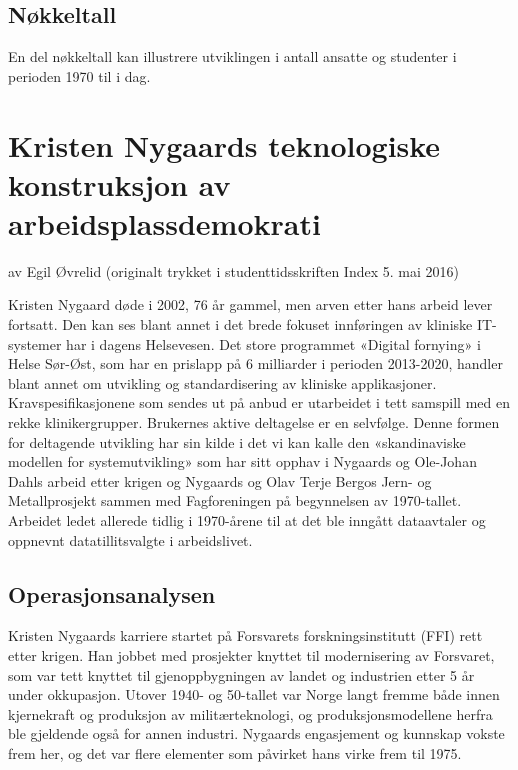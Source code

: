 \documentclass[../main.tex]{subfiles}
\begin{document}
\subsection{Nøkkeltall}
En del nøkkeltall kan illustrere utviklingen i antall ansatte og studenter i perioden 1970 til i dag.


\section{Kristen Nygaards teknologiske konstruksjon av arbeidsplassdemokrati}

av Egil Øvrelid
(originalt trykket i studenttidsskriften Index 5. mai 2016)

Kristen Nygaard døde i 2002, 76 år gammel, men arven etter hans arbeid lever fortsatt. Den kan ses blant annet i det brede fokuset innføringen av kliniske IT-systemer har i dagens Helsevesen. Det store programmet «Digital fornying» i Helse Sør-Øst, som har en prislapp på 6 milliarder i perioden 2013-2020, handler blant annet om utvikling og standardisering av kliniske applikasjoner. Kravspesifikasjonene som sendes ut på anbud er utarbeidet i tett samspill med en rekke klinikergrupper. Brukernes aktive deltagelse er en selvfølge. Denne formen for deltagende utvikling har sin kilde i det vi kan kalle den «skandinaviske modellen for systemutvikling» som har sitt opphav i Nygaards og Ole-Johan Dahls arbeid etter krigen og Nygaards og Olav Terje Bergos Jern- og Metallprosjekt sammen med Fagforeningen på begynnelsen av 1970-tallet. Arbeidet ledet allerede tidlig i 1970-årene til at det ble inngått dataavtaler og oppnevnt datatillitsvalgte i arbeidslivet. 

\subsection{Operasjonsanalysen}
Kristen Nygaards karriere startet på Forsvarets forskningsinstitutt (FFI) rett etter krigen. Han jobbet med prosjekter knyttet til modernisering av Forsvaret, som var tett knyttet til gjenoppbygningen av landet og industrien etter 5 år under okkupasjon. Utover 1940- og 50-tallet var Norge langt fremme både innen kjernekraft og produksjon av militærteknologi, og produksjonsmodellene herfra ble gjeldende også for annen industri. Nygaards engasjement og kunnskap vokste frem her, og det var flere elementer som påvirket hans virke frem til 1975.
\end{document}
